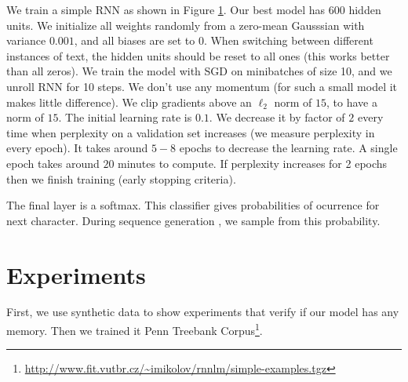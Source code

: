 \documentclass{article}
\begin{document}
We train a simple RNN as shown in Figure \ref{fig:schema}. Our best
model has 600 hidden units.  We initialize all weights randomly from a
zero-mean Gausssian with variance $0.001$, and all biases are set to
$0$.  When switching between different instances of text, the hidden
units should be reset to all ones (this works better than all zeros).
We train the model with SGD on minibatches of size 10, and we unroll RNN
for 10 steps. We don't use any momentum (for such a small model it
makes little difference). We clip gradients above an $\ell_2$ norm of
$15$, to have a norm of $15$. The 
initial learning rate is $0.1$. We decrease it by factor of $2$ every
time when perplexity on a validation set increases (we measure
perplexity in every epoch). It takes around $5-8$ epochs to decrease
the learning rate. A single epoch takes around $20$ minutes to compute. If perplexity
increases for 2 epochs then we finish training (early stopping
criteria).



\begin{figure}
  \label{fig:schema}
\end{figure}

The final layer is a softmax. This classifier gives probabilities of
ocurrence for next character. During sequence generation , we sample
from this probability.


\section{Experiments}\label{sec:experiments}
First, we use synthetic data to show experiments that verify if our model has any memory. 
Then we trained it Penn Treebank Corpus\footnote{\url{http://www.fit.vutbr.cz/~imikolov/rnnlm/simple-examples.tgz}}.  
\end{document}
